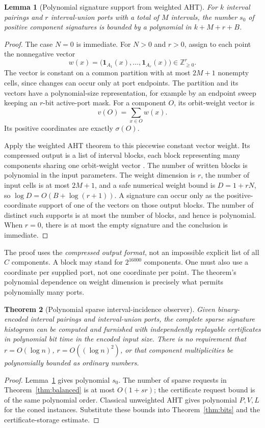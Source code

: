 \documentclass[11pt,letterpaper]{article}
\newtheorem{theorem}{Theorem}[section]
\newtheorem{lemma}[theorem]{Lemma}
\newcommand{\ZZ}{\mathbb Z}
\begin{document}
\begin{lemma}[Polynomial signature support from weighted AHT]
\label{lem:polysupport}
For $k$ interval pairings and $r$ interval-union ports with a total of $M$
intervals, the number $s_0$ of positive component signatures is bounded by a
polynomial in $k+M+r+B$.
\end{lemma}
\begin{proof}
The case $N=0$ is immediate. For $N>0$ and $r>0$, assign to each point the nonnegative vector
\[
 w(x)=\bigl(\mathbf1_{A_1}(x),\ldots,\mathbf1_{A_r}(x)\bigr)\in\ZZ_{\geq0}^r.
\]
The vector is constant on a common partition with at most $2M+1$ nonempty
cells, since changes can occur only at port endpoints. The partition and its
vectors have a polynomial-size representation, for example by an endpoint
sweep keeping an $r$-bit active-port mask. For a component $O$, its orbit-weight
vector is
\[
 v(O)=\sum_{x\in O}w(x).
\]
Its positive coordinates are exactly $\sigma(O)$.

Apply the weighted AHT theorem to this piecewise constant vector weight.
Its compressed output is a list of interval blocks, each block representing
many components sharing one orbit-weight vector \cite[Section 6]{aht}.
The number of written blocks is polynomial in the input parameters. The weight
dimension is $r$, the number of input cells is at most $2M+1$, and a safe
numerical weight bound is $D=1+rN$, so $\log D=O(B+\log(r+1))$. A signature
can occur only as the positive-coordinate support of one of the vectors on
those output blocks. The number of distinct such supports is at most the
number of blocks, and hence is polynomial. When $r=0$, there is at most the
empty signature and the conclusion is immediate.
\end{proof}

The proof uses the \emph{compressed output format}, not an impossible explicit
list of all $C$ components. A block may stand for $2^{16000}$ components. One
must also use a coordinate per supplied port, not one coordinate per point.
The theorem's polynomial dependence on weight dimension is precisely what
permits polynomially many ports.

\begin{theorem}[Polynomial sparse interval-incidence observer]
\label{thm:polynomial}
Given binary-encoded interval pairings and interval-union ports, the complete
sparse signature histogram can be computed and furnished with independently
replayable certificates in polynomial bit time in the encoded input size.
There is no requirement that $r=O(\log n)$, $r=O((\log n)^2)$, or that component
multiplicities be polynomially bounded as ordinary numbers.
\end{theorem}
\begin{proof}
Lemma~\ref{lem:polysupport} gives polynomial $s_0$. The number of sparse
requests in Theorem~\ref{thm:balanced} is at most $O(1+sr)$; the certificate
request bound is of the same polynomial order. Classical unweighted AHT gives
polynomial $P,V,L$ for the coned instances. Substitute these bounds into
Theorem~\ref{thm:bits} and the certificate-storage estimate.
\end{proof}
\end{document}
